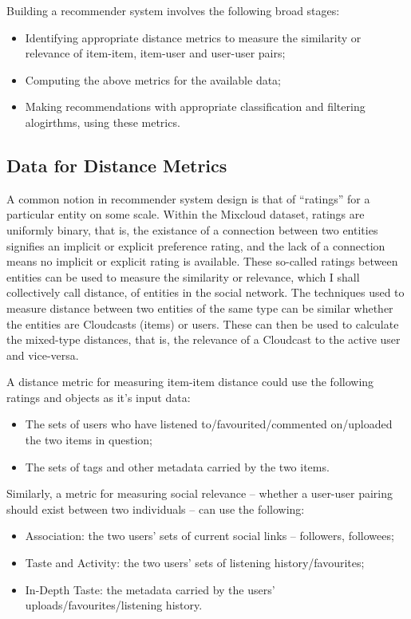 Building a recommender system involves the following broad stages: 
\begin{itemize}
 \item Identifying appropriate distance metrics to measure the similarity or relevance of item-item, item-user and user-user pairs;
 \item Computing the above metrics for the available data;
 \item Making recommendations with appropriate classification and filtering alogirthms, using these metrics.
\end{itemize}

\subsection*{Data for Distance Metrics}

A common notion in recommender system design is that of ``ratings'' for a particular entity on some scale. Within the Mixcloud dataset, ratings are uniformly binary, that is, the existance of a connection between two entities signifies an implicit or explicit preference rating, and the lack of a connection means no implicit or explicit rating is available. These so-called ratings between entities can be used to measure the similarity or relevance, which I shall collectively call distance, of entities in the social network. The techniques used to measure distance between two entities of the same type can be similar whether the entities are Cloudcasts (items) or users. These can then be used to calculate the mixed-type distances, that is, the relevance of a Cloudcast to the active user and vice-versa.

A distance metric for measuring item-item distance could use the following ratings and objects as it's input data: 
\begin{itemize}
 \item The sets of users who have listened to/favourited/commented on/uploaded the two items in question;
 \item The sets of tags and other metadata carried by the two items.
\end{itemize}


Similarly, a metric for measuring social relevance -- whether a user-user pairing should exist between two individuals -- can use the following:
\begin{itemize}
 \item Association: the two users' sets of current social links -- followers, followees; 
 \item Taste and Activity: the two users' sets of listening history/favourites;
 \item In-Depth Taste: the metadata carried by the users' uploads/favourites/listening history.
\end{itemize}

